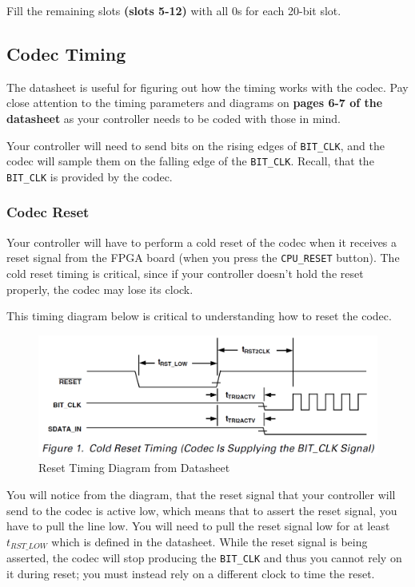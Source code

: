 \documentclass[11pt]{article}
\begin{document}
Fill the remaining slots \textbf{(slots 5-12)} with all 0s for each 20-bit slot.

\subsection{Codec Timing}
The datasheet is useful for figuring out how the timing works with the codec. Pay close attention to the timing parameters and diagrams on \textbf{pages 6-7 of the datasheet} as your controller needs to be coded with those in mind.

Your controller will need to send bits on the rising edges of \verb|BIT_CLK|, and the codec will sample them on the falling edge of the \verb|BIT_CLK|. Recall, that the \verb|BIT_CLK| is provided by the codec.

\subsubsection{Codec Reset}
Your controller will have to perform a cold reset of the codec when it receives a reset signal from the FPGA board (when you press the \verb|CPU_RESET| button). The cold reset timing is critical, since if your controller doesn't hold the reset properly, the codec may lose its clock.

This timing diagram below is critical to understanding how to reset the codec.

\begin{figure}[hbt]
	\begin{center}
		\includegraphics[width=6in]{ac97_codec_timing}
		\caption{Reset Timing Diagram from Datasheet}
	\end{center}
\end{figure}

You will notice from the diagram, that the reset signal that your controller will send to the codec is active low, which means that to assert the reset signal, you have to pull the line low. You will need to pull the reset signal low for at least $t_{RST\_LOW}$ which is defined in the datasheet. While the reset signal is being asserted, the codec will stop producing the \verb|BIT_CLK| and thus you cannot rely on it during reset; you must instead rely on a different clock to time the reset.
\end{document}
